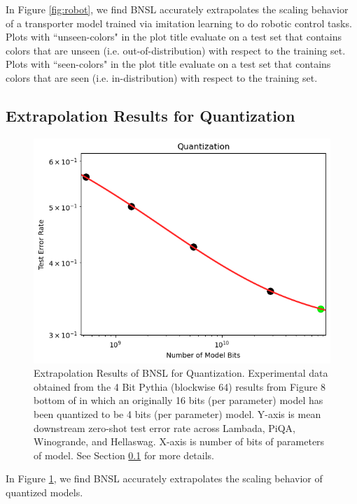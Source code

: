 \documentclass{article} %
\begin{document}
\vspace{-1.0mm}

In Figure \ref{fig:robot}, we find BNSL accurately extrapolates the scaling behavior of a transporter \citep{zeng2021transporter} model trained via imitation learning to do robotic control tasks. Plots with ``unseen-colors" in the plot title evaluate on a test set that contains colors that are unseen (i.e. out-of-distribution) with respect to the training set. Plots with ``seen-colors" in the plot title evaluate on a test set that contains colors that are seen (i.e. in-distribution) with respect to the training set.


\clearpage

\vspace{-1.0mm}

\subsection{Extrapolation Results for Quantization}
\label{section:quantization}
\vspace{-3.0mm}
\begin{figure}[htbp]
    \centering
\includegraphics[width=1.0\textwidth]{figures/quantization/quantization.png}
\vspace{-3.0mm}
    \caption{
Extrapolation Results of BNSL for Quantization. Experimental data obtained from the 4 Bit Pythia (blockwise 64) results from Figure 8 bottom of \cite{dettmers2022case} in which an originally 16 bits (per parameter) model has been quantized to be 4 bits (per parameter) model. Y-axis is mean downstream zero-shot test error rate across Lambada, PiQA, Winogrande, and Hellaswag. X-axis is number of bits of parameters of model. See Section \ref{section:quantization} for more details.
    }
    \label{fig:quantization}
\end{figure}
\vspace{-1.0mm}
In Figure \ref{fig:quantization}, we find BNSL accurately extrapolates the scaling behavior of quantized models.
\end{document}
